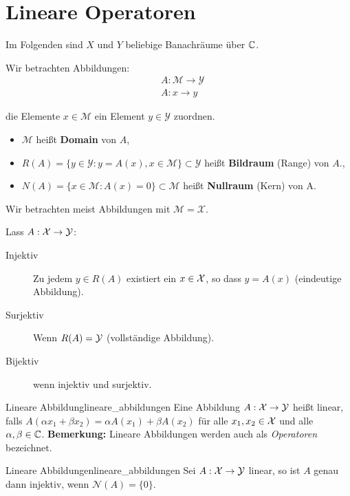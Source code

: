 \section{Lineare Operatoren}
Im Folgenden sind $X$ und $Y$ beliebige Banachräume über $\mathbb{C}$.

Wir betrachten Abbildungen:
\begin{align*}
  &A: \mathcal{M} \to \mathcal{Y}\\
  &A: x \to y
\end{align*}

die Elemente $x \in \mathcal{M}$ ein Element $y \in \mathcal{Y}$ zuordnen.
\begin{itemize}
        \item $\mathcal{M}$ heißt \textbf{Domain} von $A$,
        \item $R(A) = \{y \in \mathcal{Y}: y = A(x), x \in \mathcal{M}\} \subset \mathcal{Y}$ heißt \textbf{Bildraum} (Range) von $A$.,
        \item $N(A) = \{x \in \mathcal{M} : A(x) = 0\} \subset \mathcal{M}$ heißt \textbf{Nullraum} (Kern) von A.
\end{itemize}

Wir betrachten meist Abbildungen mit $\mathcal{M} = \mathcal{X}$.

Lass $A : \mathcal{X} \to \mathcal{Y}$:
\begin{description}
        \item[Injektiv] Zu jedem $y \in R(A)$ existiert ein $x \in \mathcal{X}$, so dass $y = A(x)$ (eindeutige Abbildung).
        \item[Surjektiv] Wenn $R(A) = \mathcal{Y}$ (vollständige Abbildung).
        \item[Bijektiv] wenn injektiv und surjektiv.
\end{description}

\begin{boringDef}{Lineare Abbildung}{lineare_abbildungen}
  Eine Abbildung $A : \mathcal{X} \to \mathcal{Y}$ heißt linear, falls $A(\alpha x_{1} + \beta x_{2}) = \alpha A(x_{1}) + \beta A(x_{2}) $ für alle $x_{1}, x_{2} \in \mathcal{X}$ und alle $\alpha, \beta \in \mathbb{C}$.
  \textbf{Bemerkung:} Lineare Abbildungen werden auch als \textit{Operatoren} bezeichnet.
\end{boringDef}

\begin{mytheo}{Lineare Abbildungen}{lineare_abbildungen}
  Sei $A : \mathcal{X} \to \mathcal{Y}$ linear, so ist $A$ genau dann injektiv, wenn $\mathcal{N}(A) = \{0\}$.
\end{mytheo}

